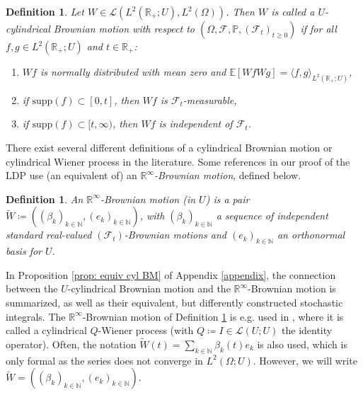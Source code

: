 \documentclass{amsart}
\newcommand{\<}{\langle}
\newcommand{\?}{\rangle}
\newcommand{\supp}{\mathrm{supp}}
\theoremstyle{plain}
\theoremstyle{remark}
\theoremstyle{plain}
\newtheorem{definition}[theorem]{Definition}
\numberwithin{equation}{section}
\def\N{{\mathbb N}}
\def\R{{\mathbb R}}
\newcommand{\E}{\mathbb{E}}
\newcommand{\F}{\mathcal{F}}
\renewcommand{\P}{\mathbb{P}}
\newcommand{\Om}{\Omega}
\begin{document}
\begin{definition}\label{def: cylindrical BM}
Let $W\in\mathcal{L}(L^2(\R_+;U),L^2(\Om))$. Then $W$ is called a \emph{$U$-cylindrical Brownian motion with respect to $(\Om,\F,\P,(\F_t)_{t\geq 0})$} if for all $f,g\in L^2(\R_+;U)$ and $t\in\R_+$:
  \begin{enumerate}[label=\emph{(\roman*)},ref=\textup{(\roman*)}]
    \item \label{it:bm1} $Wf$ is normally distributed with mean zero and $\E[Wf Wg]=\<f,g\?_{L^2(\R_+;U)}$,
    \item \label{it:bm2} if $\supp(f)\subset [0,t]$, then $Wf$ is $\F_t$-measurable,
    \item \label{it:bm3} if $\supp(f)\subset [t,\infty)$, then $Wf$ is independent of $\F_t$.
  \end{enumerate}
\end{definition}

 There exist several different definitions of a cylindrical Brownian motion or cylindrical Wiener process in the literature. Some references in our proof of the LDP use (an equivalent of) an \emph{$\R^\infty$-Brownian motion}, defined below.

\begin{definition}\label{def: sequence independent BM}
An \emph{$\R^\infty$-Brownian motion} (in $U$) is a pair $\tilde{W}\coloneqq ((\beta_k)_{k\in\N},(e_k)_{k\in\N})$, with $(\beta_k)_{k\in\N}$ a sequence of independent standard real-valued $(\F_t)$-Brownian motions and $(e_k)_{k\in\N}$ an orthonormal basis for $U$.
\end{definition}

In Proposition \ref{prop: equiv cyl BM} of Appendix \ref{appendix}, the connection between the $U$-cylindrical Brownian motion and the $\R^\infty$-Brownian motion is summarized, as well as their equivalent, but differently constructed stochastic integrals.
The $\R^\infty$-Brownian motion of Definition \ref{def: sequence independent BM} is e.g. \!used in \cite{liurockner15}, where it is called a cylindrical $Q$-Wiener process (with $Q\coloneqq I\in\mathcal{L}(U;U)$ the identity operator). Often, the notation $\tilde{W}(t)= \sum_{k\in\N}\beta_k(t)e_k$ is also used, which is only formal as the series does not converge in $L^2(\Om;U)$. However, we will write $\tilde{W}=((\beta_k)_{k\in\N},(e_k)_{k\in\N})$.
\end{document}
